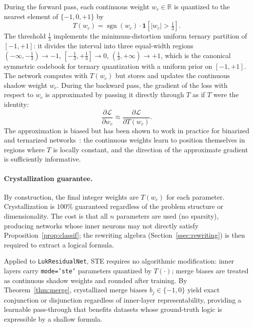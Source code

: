 \documentclass[lettersize,journal]{IEEEtran}
\begin{document}
During the forward pass, each continuous weight $w_c \in \mathbb{R}$ is
quantized to the nearest element of $\{-1, 0, +1\}$ by
\begin{equation}
  T(w_c) = \operatorname{sgn}(w_c) \cdot \mathbf{1}\!\left[|w_c| > \tfrac{1}{3}\right].
  \label{eq:T}
\end{equation}
The threshold $\tfrac{1}{3}$ implements the minimum-distortion uniform
ternary partition of $[-1,+1]$: it divides the interval into three
equal-width regions
$(-\infty,-\tfrac{1}{3}) \to -1$,
$[-\tfrac{1}{3},+\tfrac{1}{3}] \to 0$,
$(\tfrac{1}{3},+\infty) \to +1$,
which is the canonical symmetric codebook for ternary quantization with a
uniform prior on $[-1,+1]$.
The network computes with $T(w_c)$ but stores and updates the continuous
shadow weight $w_c$.
During the backward pass, the gradient of the loss with respect to $w_c$ is
approximated by passing it directly through $T$ as if $T$ were the identity:
\begin{equation}
  \frac{\partial \mathcal{L}}{\partial w_c}
    \approx \frac{\partial \mathcal{L}}{\partial T(w_c)}.
  \label{eq:ste}
\end{equation}
The approximation is biased but has been shown to work in practice for
binarized and ternarized networks~\cite{courbariaux2016,li2016}: the
continuous weights learn to position themselves in regions where $T$ is
locally constant, and the direction of the approximate gradient is
sufficiently informative.

\paragraph{Crystallization guarantee.}
By construction, the final integer weights are $T(w_c)$ for each parameter.
Crystallization is $100\%$ guaranteed regardless of the problem structure
or dimensionality.
The cost is that all $n$ parameters are used (no sparsity), producing
networks whose inner neurons may not directly satisfy
Proposition~\ref{prop:classif}; the rewriting algebra (Section~\ref{ssec:rewriting})
is then required to extract a logical formula.

Applied to \texttt{LukResidualNet}, STE requires no algorithmic modification:
inner layers carry \texttt{mode='ste'} parameters quantized by $T(\cdot)$;
merge biases are treated as continuous shadow weights and rounded after training.
By Theorem~\ref{thm:merge}, crystallized merge biases $b_j \in \{-1,0\}$
yield exact conjunction or disjunction regardless of inner-layer representability,
providing a learnable pass-through that benefits datasets whose ground-truth
logic is expressible by a shallow formula.
\end{document}
